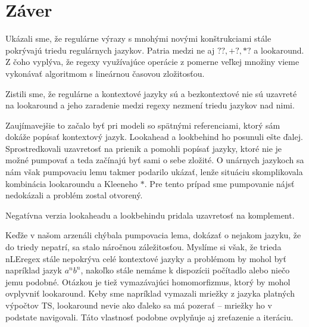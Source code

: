 \chapter*{Záver}\label{chap:conc}
{}

Ukázali sme, že regulárne výrazy s mnohými novými konštrukciami stále pokrývajú triedu regulárnych jazykov. Patria medzi ne aj $??,+?,*?$ a lookaround. Z čoho vyplýva, že regexy využívajúce operácie z pomerne veľkej množiny vieme vykonávať algoritmom s lineárnou časovou zložitosťou.

Zistili sme, že regulárne a kontextové jazyky sú a bezkontextové nie sú uzavreté na lookaround a jeho zaradenie medzi regexy nezmení triedu jazykov nad nimi.

Zaujímavejšie to začalo byť pri modeli so spätnými referenciami, ktorý sám dokáže popísať kontextový jazyk. Lookahead a lookbehind ho posunuli ešte ďalej. Sprostredkovali uzavretosť na prienik a pomohli popísať jazyky, ktoré nie je možné pumpovať a teda začínajú byť sami o sebe zložité. O unárnych jazykoch sa nám však pumpovaciu lemu takmer podarilo ukázať, lenže situáciu skomplikovala kombinácia lookaroundu a Kleeneho $*$. Pre tento prípad sme pumpovanie nájsť nedokázali a problém zostal otvorený.

Negatívna verzia lookaheadu a lookbehindu pridala uzavretosť na komplement.

Keďže v našom arzenáli chýbala pumpovacia lema, dokázať o nejakom jazyku, že do triedy nepatrí, sa stalo náročnou záležitosťou. Myslíme si však, že trieda nLEregex stále nepokrýva celé kontextové jazyky a problémom by mohol byť napríklad jazyk $a^nb^n$, nakoľko stále nemáme k dispozícii počítadlo alebo niečo jemu podobné. Otázkou je tiež vymazávajúci homomorfizmus, ktorý by mohol ovplyvniť lookaround. Keby sme napríklad vymazali mriežky z jazyka platných výpočtov TS, lookaround nevie ako ďaleko sa má pozerať -- mriežky ho v podstate navigovali. Táto vlastnosť podobne ovplyňuje aj zreťazenie a iteráciu.

